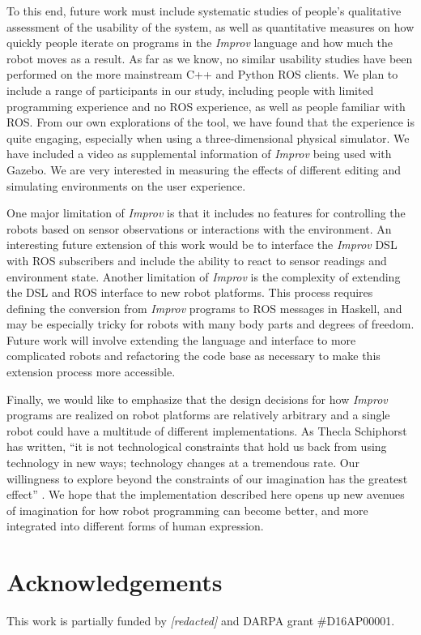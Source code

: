 \documentclass[sigchi-a]{acmart}
\begin{document}
To this end, future work must include systematic studies of people's qualitative
assessment of the usability of the system, as well as quantitative measures on
how quickly people iterate on programs in the \emph{Improv} language and how much the
robot moves as a result. As far as we know, no similar usability studies have
been performed on the more mainstream C++ and Python ROS clients. We plan to
include a range of participants in our study, including people with limited
programming experience and no ROS experience, as well as people familiar with
ROS. From our own explorations of the tool, we have found that the
experience is quite engaging, especially when using a three-dimensional
physical simulator. We have included a video as supplemental information of
\emph{Improv} being used with Gazebo. We are very interested in measuring the effects of different
editing and simulating environments on the user experience.

One major limitation of \emph{Improv} is that it includes no features for controlling the robots based on sensor
observations or interactions with the environment. An interesting future
extension of this work would be to interface the
\emph{Improv} DSL with ROS subscribers and include the ability to react to sensor readings and environment state.
Another limitation of \emph{Improv} is the complexity of extending the DSL and
ROS interface to new robot platforms. This process requires defining the
conversion from \emph{Improv} programs to ROS messages in Haskell, and may be
especially tricky for robots with many body parts and degrees of freedom.
Future work will involve extending the language and interface
to more complicated robots and refactoring the code base as necessary to make
this extension process more accessible.



Finally, we would like to emphasize that the design decisions for how
\emph{Improv} programs are realized on robot platforms are relatively arbitrary
and a single robot could have a multitude of different implementations. As
Thecla Schiphorst has written, ``it is not technological constraints that hold
us back from using technology in new ways; technology changes at a tremendous
rate. Our willingness to explore beyond the constraints of our imagination has
the greatest effect'' \cite{schiphorst}. We hope that the implementation
described here opens up new avenues of imagination for how robot programming can
become better, and more integrated into different forms of human expression.

\section{Acknowledgements}

This work is partially funded by \emph{[redacted]} and DARPA grant \#D16AP00001.

\newpage



\end{document}
